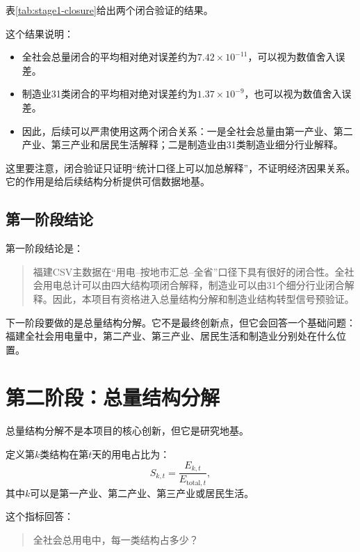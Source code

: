 \documentclass[UTF8,a4paper,11pt]{ctexart}
\begin{document}
表\ref{tab:stage1-closure}给出两个闭合验证的结果。

\begin{table}[htbp]
\centering
\caption{阶段一闭合验证摘要}
\label{tab:stage1-closure}
\resizebox{\linewidth}{!}{}
\end{table}

这个结果说明：
\begin{itemize}
  \item 全社会总量闭合的平均相对绝对误差约为$7.42\times10^{-11}$，可以视为数值舍入误差。
  \item 制造业31类闭合的平均相对绝对误差约为$1.37\times10^{-9}$，也可以视为数值舍入误差。
  \item 因此，后续可以严肃使用这两个闭合关系：一是全社会总量由第一产业、第二产业、第三产业和居民生活解释；二是制造业由31类制造业细分行业解释。
\end{itemize}

这里要注意，闭合验证只证明“统计口径上可以加总解释”，不证明经济因果关系。它的作用是给后续结构分析提供可信数据地基。

\subsection{第一阶段结论}

第一阶段结论是：

\begin{quote}
福建CSV主数据在“用电--按地市汇总--全省”口径下具有很好的闭合性。全社会用电总计可以由四大结构项闭合解释，制造业可以由31个细分行业闭合解释。因此，本项目有资格进入总量结构分解和制造业结构转型信号预验证。
\end{quote}

下一阶段要做的是总量结构分解。它不是最终创新点，但它会回答一个基础问题：福建全社会用电量中，第二产业、第三产业、居民生活和制造业分别处在什么位置。

\section{第二阶段：总量结构分解}

总量结构分解不是本项目的核心创新，但它是研究地基。

定义第$k$类结构在第$t$天的用电占比为：
\[
S_{k,t}
=
\frac{E_{k,t}}{E_{\mathrm{total},t}},
\]
其中$k$可以是第一产业、第二产业、第三产业或居民生活。

这个指标回答：

\begin{quote}
全社会总用电中，每一类结构占多少？
\end{quote}
\end{document}
